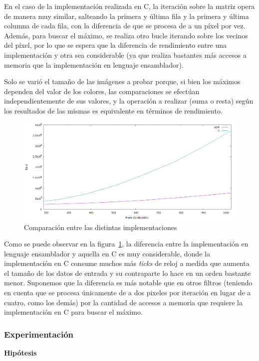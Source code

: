 \documentclass[a4paper]{article}
\begin{document}
En el caso de la implementación realizada en C, la iteración sobre la matriz opera de manera muy similar, salteando la primera y última fila y la primera y última columna de cada fila, con la diferencia de que se procesa de a un píxel por vez. Además, para buscar el máximo, se realiza otro bucle iterando sobre los vecinos del píxel, por lo que se espera que la diferencia de rendimiento entre una implementación y otra sea considerable (ya que realiza bastantes más accesos a memoria que la implementación en lenguaje ensamblador).

Solo se varió el tamaño de las imágenes a probar porque, si bien los máximos dependen del valor de los colores, las comparaciones se efectúan independientemente de sus valores, y la operación a realizar (suma o resta) según los resultados de las mismas es equivalente en términos de rendimiento.
\\
\begin{figure}[H]
  \begin{center}
	\includegraphics[scale=0.66]{imagenes/colorizarC.png}
	\caption{Comparación entre las distintas implementaciones}
	\label{colorizar_asmvsc}
  \end{center}
\end{figure}

Como se puede observar en la figura~\ref{colorizar_asmvsc}, la diferencia entre la implementación en lenguaje ensamblador y aquella en C es muy considerable, donde la implementación en C consume muchos más \textit{ticks} de reloj a medida que aumenta el tamaño de los datos de entrada y su contraparte lo hace en un orden bastante menor. Suponemos que la diferencia es más notable que en otros filtros (teniendo en cuenta que se procesa únicamente de a dos pixeles por iteración en lugar de a cuatro, como los demás) por la cantidad de accesos a memoria que requiere la implementación en C para buscar el máximo.
\\
\subsubsection{Experimentación}
\textbf{Hipótesis}
\end{document}
